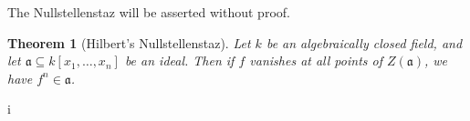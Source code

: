 \documentclass[11pt]{article}
\newtheorem{theorem}{Theorem}
\begin{document}
The Nullstellenstaz will be asserted without proof.

\begin{adjustwidth}{0.5cm}{}
  \begin{theorem}[Hilbert's Nullstellenstaz]
   Let $k$ be an algebraically closed field, and let $\mathfrak{a} \subseteq k[x_{1}, \ldots, x_{n}]$ be an ideal. Then if $f$ vanishes at all points of $Z(\mathfrak{a})$, we have $f^{n} \in \mathfrak{a}$.
  \end{theorem}
\end{adjustwidth}

i

\end{document}
